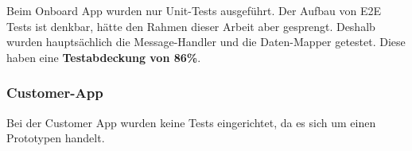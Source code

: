 Beim Onboard App wurden nur Unit-Tests ausgeführt. Der Aufbau von E2E Tests ist denkbar, hätte den Rahmen dieser Arbeit aber gesprengt. Deshalb wurden hauptsächlich die Message-Handler und die Daten-Mapper getestet. Diese haben eine \textbf{Testabdeckung von 86\%}.

\subsubsection{Customer-App}

Bei der Customer App wurden keine Tests eingerichtet, da es sich um einen Prototypen handelt.


